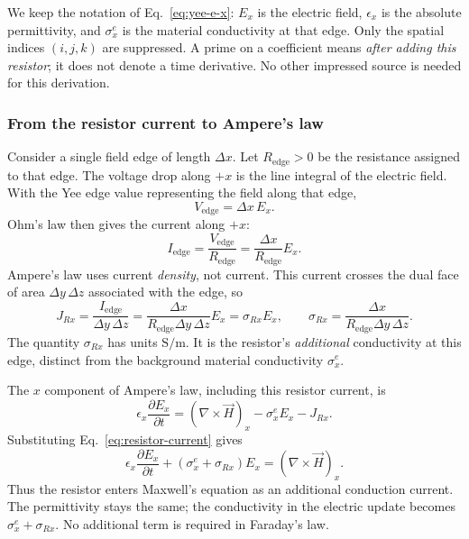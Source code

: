 \documentclass[10pt]{article}
\begin{document}
We keep the notation of Eq.~\eqref{eq:yee-e-x}: $E_x$ is the electric
field, $\epsilon_x$ is the absolute permittivity, and $\sigma_x^e$ is the
material conductivity at that edge. Only the spatial indices $(i,j,k)$ are
suppressed. A prime on a coefficient means \emph{after adding this resistor};
it does not denote a time derivative. No other impressed source is needed
for this derivation.

\subsubsection{From the resistor current to Ampere's law}
Consider a single field edge of length $\Delta x$. Let $R_{\mathrm{edge}}>0$
be the resistance assigned to that edge. The voltage drop along $+x$ is the
line integral of the electric field. With the Yee edge value representing
the field along that edge,
\begin{equation}
    V_{\mathrm{edge}}=\Delta x\,E_x.
\end{equation}
Ohm's law then gives the current along $+x$:
\begin{equation}
    I_{\mathrm{edge}}=\frac{V_{\mathrm{edge}}}{R_{\mathrm{edge}}}
        =\frac{\Delta x}{R_{\mathrm{edge}}}E_x.
\end{equation}
Ampere's law uses current \emph{density}, not current. This current crosses
the dual face of area $\Delta y\,\Delta z$ associated with the edge, so
\begin{equation}
    \boxed{J_{Rx}=\frac{I_{\mathrm{edge}}}{\Delta y\,\Delta z}
        =\frac{\Delta x}{R_{\mathrm{edge}}\Delta y\,\Delta z}E_x
        =\sigma_{Rx}E_x,\qquad
    \sigma_{Rx}=\frac{\Delta x}{R_{\mathrm{edge}}\Delta y\,\Delta z}.}
    \label{eq:resistor-current}
\end{equation}
The quantity $\sigma_{Rx}$ has units $\mathrm{S/m}$. It is the resistor's
\emph{additional} conductivity at this edge, distinct from the background
material conductivity $\sigma_x^e$.

The $x$ component of Ampere's law, including this resistor current, is
\begin{equation}
    \epsilon_x\frac{\partial E_x}{\partial t}
        =(\nabla\times\vec H)_x-\sigma_x^e E_x-J_{Rx}.
\end{equation}
Substituting Eq.~\eqref{eq:resistor-current} gives
\begin{equation}
    \boxed{\epsilon_x\frac{\partial E_x}{\partial t}
        +(\sigma_x^e+\sigma_{Rx})E_x=(\nabla\times\vec H)_x.}
    \label{eq:resistor-maxwell}
\end{equation}
Thus the resistor enters Maxwell's equation as an additional conduction
current. The permittivity stays the same; the conductivity in the electric
update becomes $\sigma_x^e+\sigma_{Rx}$. No additional term is required in
Faraday's law.
\end{document}
